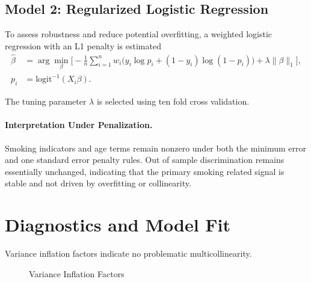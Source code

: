 \documentclass[12pt]{article}
\newcommand{\centertableinput}[1]{%
\begin{table}[H]
\centering

\end{table}
}
\begin{document}
\FloatBarrier

\subsection{Model 2: Regularized Logistic Regression}

To assess robustness and reduce potential overfitting, a weighted logistic regression with an L1 penalty is estimated
\begin{align}
\hat{\beta}
&= \arg\min_{\beta}
\Bigg[
-\frac{1}{n}\sum_{i=1}^n
w_i \Big( y_i \log p_i + (1 - y_i)\log(1 - p_i) \Big)
+ \lambda \|\beta\|_1
\Bigg],
\nonumber\\
p_i
&= \text{logit}^{-1}(X_i\beta).
\end{align}

The tuning parameter $\lambda$ is selected using ten fold cross validation.

\centertableinput{tables/lasso_coefficients.tex}

\paragraph{Interpretation Under Penalization.}

Smoking indicators and age terms remain nonzero under both the minimum error and one standard error penalty rules. Out of sample discrimination remains essentially unchanged, indicating that the primary smoking related signal is stable and not driven by overfitting or collinearity.

\centertableinput{tables/regularized_logit_metrics_in_sample.tex}

\centertableinput{tables/regularized_logit_metrics_out_of_sample.tex}

\FloatBarrier

\section{Diagnostics and Model Fit}

Variance inflation factors indicate no problematic multicollinearity.

\begin{figure}[H]
\centering
\begin{minipage}{0.85\linewidth}
\small

\end{minipage}
\caption{Variance Inflation Factors}
\end{figure}
\end{document}
